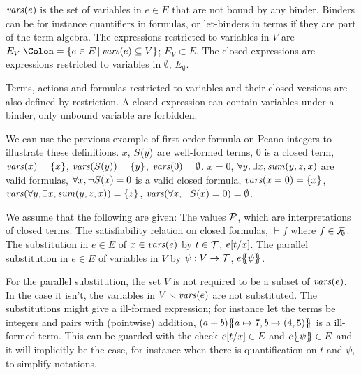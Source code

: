 \documentclass{article}
\begin{document}
\begin{defi}
 \(\mathit{vars}{\left(e\right)}\) is the set of variables in \(e \in E\) that are not bound by any binder.
	Binders can be for instance quantifiers in formulas, or let-binders in terms if they are part of the term algebra.
 The expressions restricted to variables in \(V\) are \(E_V \defnotation \mset{e \in E}{\fvars{e} \subseteq V}\); \(E_V \subset E\).
 The closed expressions are expressions restricted to variables in \(\emptyset\), \(E_\emptyset\).
\end{defi}
Terms, actions and formulas restricted to variables and their closed versions are also defined by restriction.
A closed expression can contain variables under a binder, only unbound variable are forbidden.

We can use the previous example of first order formula on Peano integers to illustrate these definitions.
\(x\), \(S{\left(y\right)}\) are well-formed terms, \(0\) is a closed term, \(\mathit{vars}{\left(x\right)} = {\left\{x\right\}}\), \(\mathit{vars}{\left(S{\left(y\right)}\right)} = {\left\{y\right\}}\), \(\mathit{vars}{\left(0\right)} = \emptyset\).
\(x = 0\), \(\forall y, \exists x, \mathit{sum}{\left(y, z, x\right)}\) are valid formulas, \(\forall x, \neg S{\left(x\right)} = 0\) is a valid closed formula, \(\mathit{vars}{\left(x = 0\right)} = {\left\{x\right\}}\), \(\mathit{vars}{\left(\forall y, \exists x, \mathit{sum}{\left(y, z, x\right)}\right)} = {\left\{z\right\}}\), \(\mathit{vars}{\left(\forall x, \neg S{\left(x\right)} = 0\right)} = \emptyset\).

\begin{defi}
We assume that the following are given:
 The values \(\mathcal{P}\), which are interpretations of closed terms.
 The satisfiability relation on closed formulas, \({\vdash} f\) where \(f \in {\mathcal{F}}_{\!\!\emptyset}\).
 The substitution in \(e \in E\) of \(x \in \mathit{vars}{\left(e\right)}\) by \(t \in {\mathcal{T}}\), \(e{\left[t\middle/x\right]}\).
 The parallel substitution in \(e \in E\) of variables in \(V\) by \(\psi: V \to {\mathcal{T}}\), \(e{\left\{\!\!{\left\{\psi\right\}}\!\!\right\}}\).
\end{defi}
For the parallel substitution, the set \(V\) is not required to be a subset of \(\mathit{vars}{\left(e\right)}\).
In the case it isn't, the variables in \(V \smallsetminus \mathit{vars}{\left(e\right)}\) are not substituted.
The substitutions might give a ill-formed expression; for instance let the terms be integers and pairs with (pointwise) addition, \({\left(a + b\right)}{\left\{\!\!{\left\{a \mapsto 7, b \mapsto {\left(4, 5\right)}\right\}}\!\!\right\}}\) is a ill-formed term.
This can be guarded with the check \(e{\left[t\middle/x\right]} \in E\) and \(e{\left\{\!\!{\left\{\psi\right\}}\!\!\right\}} \in E\) and it will implicitly be the case, for instance when there is quantification on \(t\) and \(\psi\), to simplify notations.
\end{document}
